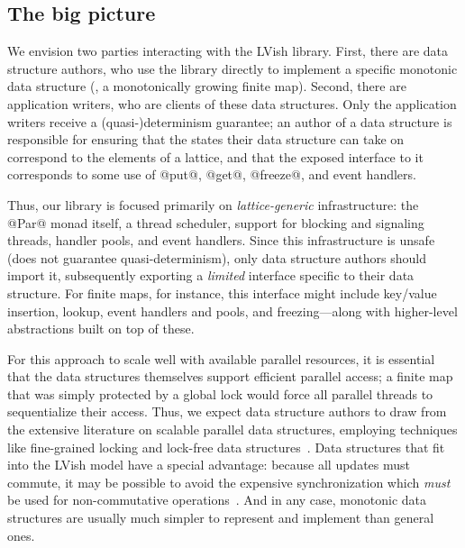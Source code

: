
\subsection{The big picture}

We envision two parties interacting with the LVish library.  First,
there are data structure authors, who use the library directly to
implement a specific monotonic data structure (\eg, a monotonically
growing finite map).  Second, there are application writers, who are
clients of these data structures.  Only the application writers
receive a \mbox{(quasi-)determinism} guarantee; an author of a data
structure is responsible for ensuring that the states their data
structure can take on correspond to the elements of a lattice, and
that the exposed interface to it corresponds to some use of @put@,
@get@, @freeze@, and event handlers.

Thus, our library is focused primarily on \emph{lattice-generic}
infrastructure: the @Par@ monad itself, a thread scheduler, support
for blocking and signaling threads, handler pools, and event handlers.
Since this infrastructure is unsafe (does not guarantee
quasi-determinism), only data structure authors should import it,
subsequently exporting a \emph{limited} interface specific to their
data structure.  For finite maps, for instance, this interface might
include key/value insertion, lookup, event handlers and pools, and
freezing---along with higher-level abstractions built on top of these.

For this approach to scale well with available parallel resources, it
is essential that the data structures themselves support efficient
parallel access; a finite map that was simply protected by a global
lock would force all parallel threads to sequentialize their access.
Thus, we expect data structure authors to draw from the extensive
literature on scalable parallel data structures, employing techniques
like fine-grained locking and lock-free data structures~\cite{art}.
Data structures that fit into the LVish model have a special
advantage: because all updates must commute, it may be possible to
avoid the expensive synchronization which \emph{must} be used for
non-commutative operations~\cite{lawsOfOrder}.  And in any case,
monotonic data structures are usually much simpler to represent and
implement than general ones.

